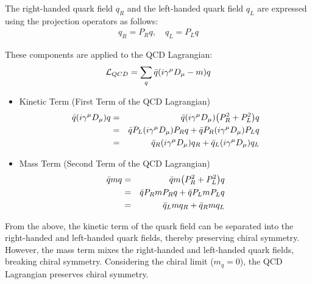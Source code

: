         The right-handed quark field $q_R$ and the left-handed quark field $q_L$ are expressed using the projection operators as follows:  
        \begin{eqnarray}  
            q_R = P_R q, \quad q_L = P_L q
        \end{eqnarray}  
        
        These components are applied to the QCD Lagrangian:  
        \begin{eqnarray}  
            \mathcal{L}_{QCD} = \sum_q \bar{q}\qty(i\gamma^\mu D_\mu - m)q
        \end{eqnarray}  
        
        \begin{itemize}
            \item Kinetic Term (First Term of the QCD Lagrangian)
                    \begin{eqnarray}  
                        \bar{q}\qty(i\gamma^\mu D_\mu)q &=& \bar{q}\qty(i\gamma^\mu D_\mu)\qty(P_R^2 + P_L^2)q \\  
                        &=& \bar{q} P_L \qty(i\gamma^\mu D_\mu) P_R q + \bar{q} P_R \qty(i\gamma^\mu D_\mu) P_L q \\  
                        &=& \bar{q}_R \qty(i\gamma^\mu D_\mu) q_R + \bar{q}_L \qty(i\gamma^\mu D_\mu) q_L  
                    \end{eqnarray}  
            
            \item Mass Term (Second Term of the QCD Lagrangian)
                    \begin{eqnarray}  
                        \bar{q}m q &=& \bar{q} m \qty(P_R^2 + P_L^2)q \\  
                        &=& \bar{q} P_R m P_R q + \bar{q} P_L m P_L q \\  
                        &=& \bar{q}_L m q_R + \bar{q}_R m q_L
                    \end{eqnarray}  
        \end{itemize}
        
        From the above, the kinetic term of the quark field can be separated into the right-handed and left-handed quark fields, thereby preserving chiral symmetry. However, the mass term mixes the right-handed and left-handed quark fields, breaking chiral symmetry. Considering the chiral limit ($m_q = 0$), the QCD Lagrangian preserves chiral symmetry.  
        
